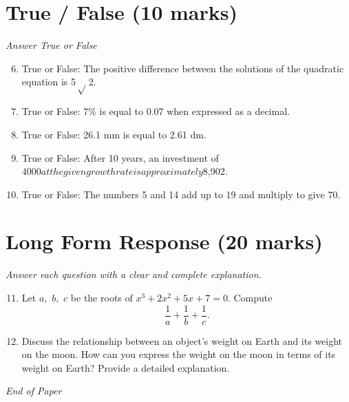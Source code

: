 \documentclass[12pt]{article}
\begin{document}
\section*{True / False (10 marks)}
\textit{Answer True or False}
\begin{enumerate}[label=\arabic*.]
\setcounter{enumi}{5}
\item True or False: The positive difference between the solutions of the quadratic equation is 5\ensuremath{\sqrt} 2.
\item True or False: 7\% is equal to 0.07 when expressed as a decimal.
\item True or False: 26.1 mm is equal to 2.61 dm.
\item True or False: After 10 years, an investment of $4000 at the given growth rate is approximately $8,902.
\item True or False: The numbers 5 and 14 add up to 19 and multiply to give 70.
\end{enumerate}

\section*{Long Form Response (20 marks)}
\textit{Answer each question with a clear and complete explanation.}
\begin{enumerate}[label=\arabic*.]
\setcounter{enumi}{10}
\item Let $a,$ $b,$ $c$ be the roots of $x^3 + 2 x^2 + 5 x + 7 = 0.$ Compute \[\frac{1}{a} + \frac{1}{b} + \frac{1}{c}.\]
\item Discuss the relationship between an object's weight on Earth and its weight on the moon. How can you express the weight on the moon in terms of its weight on Earth? Provide a detailed explanation.
\end{enumerate}

\vfill
\noindent\textit{End of Paper}
\end{document}
